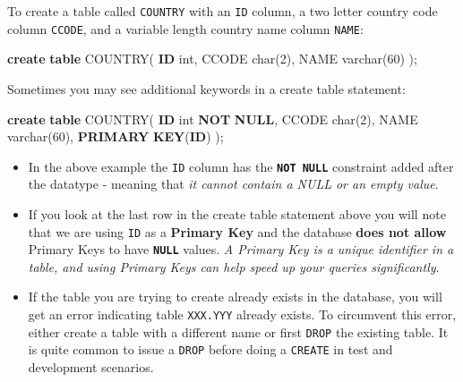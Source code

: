 \documentclass[
]{book}
\newenvironment{Shaded}{\begin{snugshade}}{\end{snugshade}}
\newcommand{\DataTypeTok}[1]{\textcolor[rgb]{0.13,0.29,0.53}{#1}}
\newcommand{\DecValTok}[1]{\textcolor[rgb]{0.00,0.00,0.81}{#1}}
\newcommand{\KeywordTok}[1]{\textcolor[rgb]{0.13,0.29,0.53}{\textbf{#1}}}
\newcommand{\NormalTok}[1]{#1}
\begin{document}
To create a table called \texttt{COUNTRY} with an \texttt{ID} column, a two letter country code column \texttt{CCODE}, and a variable length country name column \texttt{NAME}:

\begin{Shaded}
\begin{Highlighting}[]
\KeywordTok{create} \KeywordTok{table}\NormalTok{ COUNTRY(}
    \KeywordTok{ID} \DataTypeTok{int}\NormalTok{,}
\NormalTok{    CCODE }\DataTypeTok{char}\NormalTok{(}\DecValTok{2}\NormalTok{),}
\NormalTok{    NAME }\DataTypeTok{varchar}\NormalTok{(}\DecValTok{60}\NormalTok{)}
\NormalTok{);}
\end{Highlighting}
\end{Shaded}

Sometimes you may see additional keywords in a create table statement:

\begin{Shaded}
\begin{Highlighting}[]
\KeywordTok{create} \KeywordTok{table}\NormalTok{ COUNTRY(}
    \KeywordTok{ID} \DataTypeTok{int} \KeywordTok{NOT} \KeywordTok{NULL}\NormalTok{,}
\NormalTok{    CCODE }\DataTypeTok{char}\NormalTok{(}\DecValTok{2}\NormalTok{),}
\NormalTok{    NAME }\DataTypeTok{varchar}\NormalTok{(}\DecValTok{60}\NormalTok{),}
    \KeywordTok{PRIMARY} \KeywordTok{KEY}\NormalTok{(}\KeywordTok{ID}\NormalTok{)}
\NormalTok{);}
\end{Highlighting}
\end{Shaded}

\begin{itemize}
\item
  In the above example the \texttt{ID} column has the {\textbf{\texttt{NOT\ NULL}}} constraint added after the datatype - meaning that \emph{it cannot contain a NULL or an empty value}.
\item
  If you look at the last row in the create table statement above you will note that we are using \texttt{ID} as a {\textbf{Primary Key}} and the database \textbf{does not allow} Primary Keys to have \textbf{\texttt{NULL}} values. \emph{A Primary Key is a unique identifier in a table, and using Primary Keys can help speed up your queries significantly}.
\item
  If the table you are trying to create already exists in the database, you will get an error indicating table \texttt{XXX.YYY} already exists. To circumvent this error, either create a table with a different name or first \texttt{DROP} the existing table. It is quite common to issue a \texttt{DROP} before doing a \texttt{CREATE} in test and development scenarios.
\end{itemize}
\end{document}

